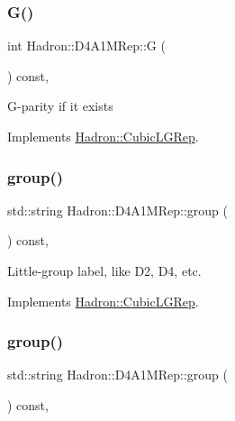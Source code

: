\subsubsection{\texorpdfstring{G()}{G()}\hspace{0.1cm}{\footnotesize\ttfamily [2/2]}}
{\footnotesize\ttfamily int Hadron\+::\+D4\+A1\+M\+Rep\+::G (\begin{DoxyParamCaption}{ }\end{DoxyParamCaption}) const\hspace{0.3cm}{\ttfamily [inline]}, {\ttfamily [virtual]}}

G-\/parity if it exists 

Implements \mbox{\hyperlink{structHadron_1_1CubicLGRep_ace26f7b2d55e3a668a14cb9026da5231}{Hadron\+::\+Cubic\+L\+G\+Rep}}.

\mbox{\label{structHadron_1_1D4A1MRep_a6329fe3f65d0c5a6538aa917500428b7}} 
\subsubsection{\texorpdfstring{group()}{group()}\hspace{0.1cm}{\footnotesize\ttfamily [1/2]}}
{\footnotesize\ttfamily std\+::string Hadron\+::\+D4\+A1\+M\+Rep\+::group (\begin{DoxyParamCaption}{ }\end{DoxyParamCaption}) const\hspace{0.3cm}{\ttfamily [inline]}, {\ttfamily [virtual]}}

Little-\/group label, like D2, D4, etc. 

Implements \mbox{\hyperlink{structHadron_1_1CubicLGRep_a9bdb14b519a611d21379ed96a3a9eb41}{Hadron\+::\+Cubic\+L\+G\+Rep}}.

\mbox{\label{structHadron_1_1D4A1MRep_a6329fe3f65d0c5a6538aa917500428b7}} 
\subsubsection{\texorpdfstring{group()}{group()}\hspace{0.1cm}{\footnotesize\ttfamily [2/2]}}
{\footnotesize\ttfamily std\+::string Hadron\+::\+D4\+A1\+M\+Rep\+::group (\begin{DoxyParamCaption}{ }\end{DoxyParamCaption}) const\hspace{0.3cm}{\ttfamily [inline]}, {\ttfamily [virtual]}}

